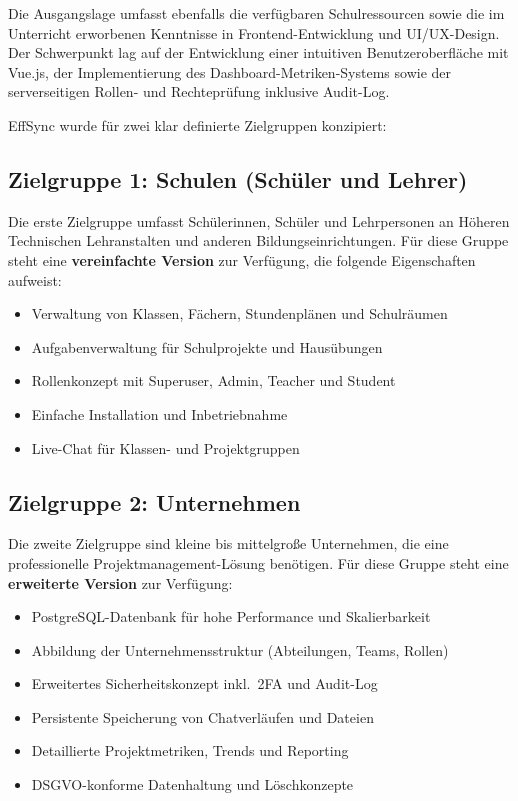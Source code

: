 Die Ausgangslage umfasst ebenfalls die verfügbaren Schulressourcen sowie
die im Unterricht erworbenen Kenntnisse in Frontend-Entwicklung und
UI/UX-Design. Der Schwerpunkt lag auf der Entwicklung einer intuitiven
Benutzeroberfläche mit Vue.js, der Implementierung des Dashboard-Metriken-Systems
sowie der serverseitigen Rollen- und Rechteprüfung inklusive Audit-Log.


EffSync wurde für zwei klar definierte Zielgruppen konzipiert:

\subsection{Zielgruppe 1: Schulen (Schüler und Lehrer)}

Die erste Zielgruppe umfasst Schülerinnen, Schüler und Lehrpersonen an
Höheren Technischen Lehranstalten und anderen Bildungseinrichtungen.
Für diese Gruppe steht eine \textbf{vereinfachte Version} zur Verfügung,
die folgende Eigenschaften aufweist:

\begin{itemize}
    \item Verwaltung von Klassen, Fächern, Stundenplänen und Schulräumen
    \item Aufgabenverwaltung für Schulprojekte und Hausübungen
    \item Rollenkonzept mit Superuser, Admin, Teacher und Student
    \item Einfache Installation und Inbetriebnahme
    \item Live-Chat für Klassen- und Projektgruppen
\end{itemize}

\subsection{Zielgruppe 2: Unternehmen}

Die zweite Zielgruppe sind kleine bis mittelgroße Unternehmen, die eine
professionelle Projektmanagement-Lösung benötigen. Für diese Gruppe
steht eine \textbf{erweiterte Version} zur Verfügung:

\begin{itemize}
    \item PostgreSQL-Datenbank für hohe Performance und Skalierbarkeit
    \item Abbildung der Unternehmensstruktur (Abteilungen, Teams, Rollen)
    \item Erweitertes Sicherheitskonzept inkl.\ \gls{2FA} und Audit-Log
    \item Persistente Speicherung von Chatverläufen und Dateien
    \item Detaillierte Projektmetriken, Trends und Reporting
    \item \gls{DSGVO}-konforme Datenhaltung und Löschkonzepte
\end{itemize}

